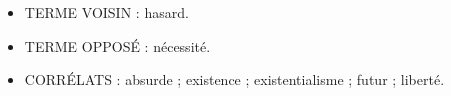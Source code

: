 \begin{itemize}[leftmargin=1cm, label=, itemsep=1pt]
\item {\footnotesize TERME VOISIN} : hasard.
\item {\footnotesize TERME OPPOSÉ} : nécessité.
\item {\footnotesize CORRÉLATS} : absurde ; existence ; existentialisme ; futur ; liberté.
\end{itemize}

